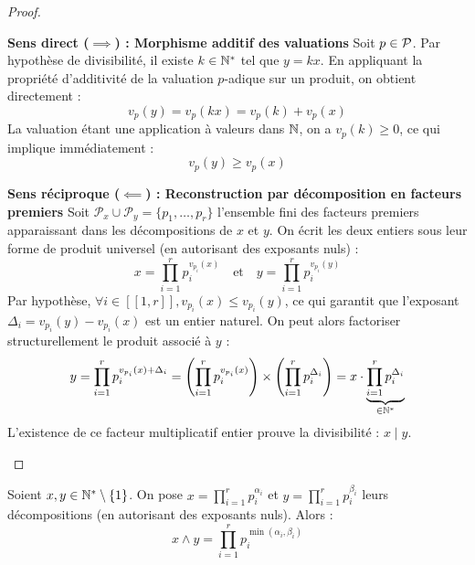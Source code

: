 \documentclass[12pt, a4paper]{report}
\begin{document}
\begin{proof}
    \begin{outline}
        \1 \textbf{Sens direct ($\implies$) : Morphisme additif des valuations}
            \2 Soit $p \in \mathcal{P}$. Par hypothèse de divisibilité, il existe $k \in \mathbb{N}^*$ tel que $y = kx$.
            \2 En appliquant la propriété d'additivité de la valuation $p$-adique sur un produit, on obtient directement :
               \[ v_p(y) = v_p(kx) = v_p(k) + v_p(x) \]
            \2 La valuation étant une application à valeurs dans $\mathbb{N}$, on a $v_p(k) \ge 0$, ce qui implique immédiatement :
               \[ v_p(y) \ge v_p(x) \]

        \1 \textbf{Sens réciproque ($\impliedby$) : Reconstruction par décomposition en facteurs premiers}
            \2 Soit $\mathcal{P}_x \cup \mathcal{P}_y = \{p_1, \dots, p_r\}$ l'ensemble fini des facteurs premiers apparaissant dans les décompositions de $x$ et $y$. 
            \2 On écrit les deux entiers sous leur forme de produit universel (en autorisant des exposants nuls) :
               \[ x = \prod_{i=1}^r p_i^{v_{p_i}(x)} \quad \text{et} \quad y = \prod_{i=1}^r p_i^{v_{p_i}(y)} \]
            \2 Par hypothèse, $\forall i \in [\![ 1, r ]\!], v_{p_i}(x) \le v_{p_i}(y)$, ce qui garantit que l'exposant $\Delta_i = v_{p_i}(y) - v_{p_i}(x)$ est un entier naturel.
            \2 On peut alors factoriser structurellement le produit associé à $y$ :
               \[ y = \prod_{i=1}^r p_i^{v_{p_i}(x) + \Delta_i} = \left(\prod_{i=1}^r p_i^{v_{p_i}(x)}\right) \times \left(\prod_{i=1}^r p_i^{\Delta_i}\right) = x \cdot \underbrace{\prod_{i=1}^r p_i^{\Delta_i}}_{\in \mathbb{N}^*} \]
            \2 L'existence de ce facteur multiplicatif entier prouve la divisibilité : $x \mid y$.
    \end{outline}
\end{proof}

\begin{theorem}
    Soient $x,y \in \mathbb{N}^*\setminus\{1\}$.
    On pose $x = \prod_{i=1}^r p_i^{\alpha_i}$ et $y = \prod_{i=1}^r p_i^{\beta_i}$ leurs décompositions (en autorisant des exposants nuls).
    Alors :
    $$x \wedge y = \prod_{i=1}^r p_i^{\min(\alpha_i,\beta_i)}$$
\end{theorem}
\end{document}
